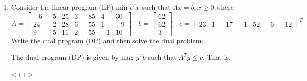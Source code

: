 \documentclass{article}
\begin{document}
\begin{enumerate}
\begin{enumerate}[a)]
\begin{soln}
					\begin{align*}
						\max\quad b^T z & \\
						\text{s.t.}\quad A^T z&\le c \\
						z\ge 0
					\end{align*} or
					\begin{align*}
						\max\quad 3z_1-7z_2+9z_3-9z_4 & \\
						\text{s.t.}\quad z_1-5z_2-2z_3+2z_4 &\le -4 \\
						3z_1+z_2+3z_3-3z_4 &\le 6 \\
						-3z_1-z_2-3z_3+3z_4 &\le -6 \\
						z_1, z_2, z_3, z_4 &\ge 0
					\end{align*}
				\end{soln}

			\item Show how the dual programs from part a, b, are equivalent.
				\begin{proof}
					In part a, the condition $-y_1\le 0$ means that $y_1\ge 0,$ so let $y_1=z_1\ge 0.$ Then we have $y_2\le 0$ so let $-y_2=z_2\ge 0.$ Then since $y_3$ is unrestricted, let $y_3=z_3-z_4,$ where $z_3, z_4\ge 0.$ Making these substitutions into the result from part a, we have
					\begin{align*}
						\max\quad 3z_1-7z_2+9z_3-9z_4 & \\
						\text{s.t.}\quad z_1-5z_2-2z_3+2z_4 &\le -4 \\
						3z_3+z_2+3z_3-3z_4 &\le 6 \\
						-3z_1-z_2-3z_3+3z_4 &\le -6 \\
						z_1, z_2, z_3, z_4 &\ge 0
					\end{align*} which is exactly the problem we obtained in part b.
					
				\end{proof}

		\end{enumerate}

	\item Consider the linear program (LP) min $c^T x$ such that $Ax=b, x\ge 0$ where \[A=\begin{bmatrix}
				-6 & -5 & 25 & 3 & -85 & 4 & 30 \\
				24 & -2 & 28 & 6 & -55 & 1 & -9 \\
				9 & -5 & 11 & 2 & -55 & -1 & 10
			\end{bmatrix}\quad b=\begin{bmatrix}
				62 \\ 62 \\ 3
			\end{bmatrix}\quad c=\begin{bmatrix}
				23 & 1 & -17 & -1 & 52 & -6 & -12
		\end{bmatrix}^T\]
		Write the dual program (DP) and then solve the dual problem.
		\begin{soln}
			The dual program (DP) is given by max $y^T b$ such that $A^T y\le c.$ That is, 
		\end{soln}<++>


\end{enumerate}
\end{document}
